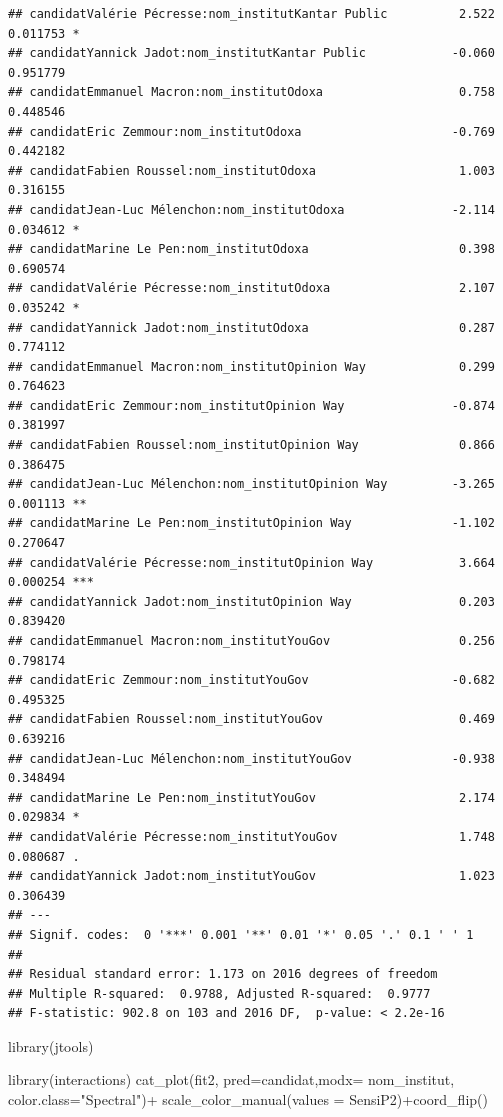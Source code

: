 \documentclass[
]{book}
\newenvironment{Shaded}{\begin{snugshade}}{\end{snugshade}}
\newcommand{\AttributeTok}[1]{\textcolor[rgb]{0.77,0.63,0.00}{#1}}
\newcommand{\FunctionTok}[1]{\textcolor[rgb]{0.00,0.00,0.00}{#1}}
\newcommand{\NormalTok}[1]{#1}
\newcommand{\SpecialCharTok}[1]{\textcolor[rgb]{0.00,0.00,0.00}{#1}}
\newcommand{\StringTok}[1]{\textcolor[rgb]{0.31,0.60,0.02}{#1}}
\begin{document}
\begin{verbatim}
## candidatValérie Pécresse:nom_institutKantar Public          2.522 0.011753 *  
## candidatYannick Jadot:nom_institutKantar Public            -0.060 0.951779    
## candidatEmmanuel Macron:nom_institutOdoxa                   0.758 0.448546    
## candidatEric Zemmour:nom_institutOdoxa                     -0.769 0.442182    
## candidatFabien Roussel:nom_institutOdoxa                    1.003 0.316155    
## candidatJean-Luc Mélenchon:nom_institutOdoxa               -2.114 0.034612 *  
## candidatMarine Le Pen:nom_institutOdoxa                     0.398 0.690574    
## candidatValérie Pécresse:nom_institutOdoxa                  2.107 0.035242 *  
## candidatYannick Jadot:nom_institutOdoxa                     0.287 0.774112    
## candidatEmmanuel Macron:nom_institutOpinion Way             0.299 0.764623    
## candidatEric Zemmour:nom_institutOpinion Way               -0.874 0.381997    
## candidatFabien Roussel:nom_institutOpinion Way              0.866 0.386475    
## candidatJean-Luc Mélenchon:nom_institutOpinion Way         -3.265 0.001113 ** 
## candidatMarine Le Pen:nom_institutOpinion Way              -1.102 0.270647    
## candidatValérie Pécresse:nom_institutOpinion Way            3.664 0.000254 ***
## candidatYannick Jadot:nom_institutOpinion Way               0.203 0.839420    
## candidatEmmanuel Macron:nom_institutYouGov                  0.256 0.798174    
## candidatEric Zemmour:nom_institutYouGov                    -0.682 0.495325    
## candidatFabien Roussel:nom_institutYouGov                   0.469 0.639216    
## candidatJean-Luc Mélenchon:nom_institutYouGov              -0.938 0.348494    
## candidatMarine Le Pen:nom_institutYouGov                    2.174 0.029834 *  
## candidatValérie Pécresse:nom_institutYouGov                 1.748 0.080687 .  
## candidatYannick Jadot:nom_institutYouGov                    1.023 0.306439    
## ---
## Signif. codes:  0 '***' 0.001 '**' 0.01 '*' 0.05 '.' 0.1 ' ' 1
## 
## Residual standard error: 1.173 on 2016 degrees of freedom
## Multiple R-squared:  0.9788, Adjusted R-squared:  0.9777 
## F-statistic: 902.8 on 103 and 2016 DF,  p-value: < 2.2e-16
\end{verbatim}

\begin{Shaded}
\begin{Highlighting}[]
\FunctionTok{library}\NormalTok{(jtools)}

\FunctionTok{library}\NormalTok{(interactions)}
\FunctionTok{cat\_plot}\NormalTok{(fit2, }\AttributeTok{pred=}\NormalTok{candidat,}\AttributeTok{modx=}\NormalTok{ nom\_institut, }\AttributeTok{color.class=}\StringTok{"Spectral"}\NormalTok{)}\SpecialCharTok{+}
  \FunctionTok{scale\_color\_manual}\NormalTok{(}\AttributeTok{values =}\NormalTok{ SensiP2)}\SpecialCharTok{+}\FunctionTok{coord\_flip}\NormalTok{()}
\end{Highlighting}
\end{Shaded}
\end{document}
